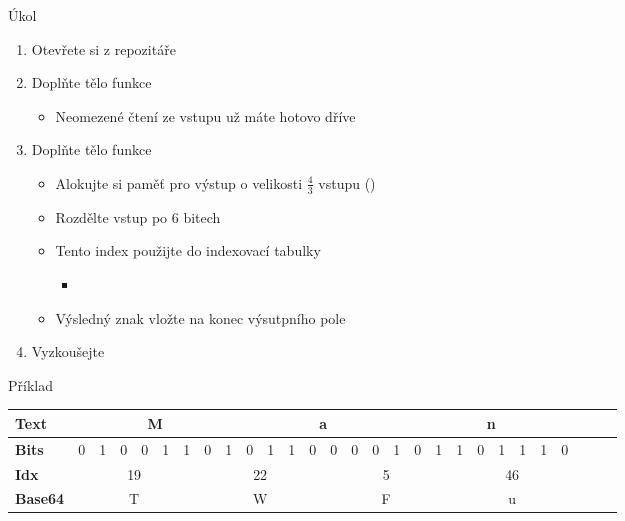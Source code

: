 \begin{frame}{Úkol}

  \begin{enumerate}
    \item Otevřete si  z repozitáře

    \item Doplňte tělo funkce 
    \begin{itemize}
      \item Neomezené čtení ze vstupu už máte hotovo dříve
    \end{itemize}

    \item Doplňte tělo funkce 
    \begin{itemize}
      \item Alokujte si paměť pro výstup o velikosti $\frac{4}{3}$ vstupu
        ()
      \item Rozdělte vstup po 6 bitech
      \item Tento index použijte do indexovací tabulky
      \begin{itemize}
	\item \scriptsize
      \end{itemize}

      \item Výsledný znak vložte na konec výsutpního pole
    \end{itemize}

    \item Vyzkoušejte
  \end{enumerate}

  \medskip

  \begin{block}{Příklad}
  \begin{center}
  \setlength{\tabcolsep}{2.8pt}
  \begin{tabular}{|l|l|l|l|l|l|l|l|l|l|l|l|l|l|l|l|l|l|l|l|l|l|l|l|l|l|l|l|} \hline
    \textbf{Text} & \multicolumn{8}{c|}{M} & \multicolumn{8}{c|}{a} & \multicolumn{8}{c|}{n} \\ \hline
    \textbf{Bits} & 0  & 1  & 0  & 0  & 1  & 1  & 0  & 1  & 0  & 1  & 1  & 0  & 0  & 0  & 0  & 1  & 0  & 1  & 1  & 0  & 1  & 1  & 1  & 0 \\ \hline
    \textbf{Idx} & \multicolumn{6}{c|}{19} & \multicolumn{6}{c|}{22} & \multicolumn{6}{c|}{5} & \multicolumn{6}{c|}{46} \\ \hline
    \textbf{Base64} & \multicolumn{6}{c|}{T} & \multicolumn{6}{c|}{W} & \multicolumn{6}{c|}{F} & \multicolumn{6}{c|}{u} \\ \hline
  \end{tabular}
  \end{center}
  \end{block}

\end{frame}

